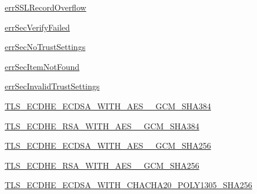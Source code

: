 \begin{DoxyCompactItemize}
\item 
\hyperlink{classpip_1_1__vendor_1_1urllib3_1_1contrib_1_1__securetransport_1_1bindings_1_1SecurityConst_a6361ab6de54d509899653e2301738fa6}{err\+S\+S\+L\+Record\+Overflow}
\item 
\hyperlink{classpip_1_1__vendor_1_1urllib3_1_1contrib_1_1__securetransport_1_1bindings_1_1SecurityConst_aa01c55eec87ae47c4c9557a581bef493}{err\+Sec\+Verify\+Failed}
\item 
\hyperlink{classpip_1_1__vendor_1_1urllib3_1_1contrib_1_1__securetransport_1_1bindings_1_1SecurityConst_aeabb8b2ed14e497e4c3575dc96698fb8}{err\+Sec\+No\+Trust\+Settings}
\item 
\hyperlink{classpip_1_1__vendor_1_1urllib3_1_1contrib_1_1__securetransport_1_1bindings_1_1SecurityConst_acc24ffa98895ba23120d1c7014f6dd15}{err\+Sec\+Item\+Not\+Found}
\item 
\hyperlink{classpip_1_1__vendor_1_1urllib3_1_1contrib_1_1__securetransport_1_1bindings_1_1SecurityConst_ab6516c07d300da7c704e2b7b22a98fb0}{err\+Sec\+Invalid\+Trust\+Settings}
\item 
\hyperlink{classpip_1_1__vendor_1_1urllib3_1_1contrib_1_1__securetransport_1_1bindings_1_1SecurityConst_ac43d314fcc301759995d34ff92bcbcaa}{T\+L\+S\+\_\+\+E\+C\+D\+H\+E\+\_\+\+E\+C\+D\+S\+A\+\_\+\+W\+I\+T\+H\+\_\+\+A\+E\+S\+\_\+\_\+\+G\+C\+M\+\_\+\+S\+H\+A384}
\item 
\hyperlink{classpip_1_1__vendor_1_1urllib3_1_1contrib_1_1__securetransport_1_1bindings_1_1SecurityConst_a7bf45af084c63e979b5e0a530e99d398}{T\+L\+S\+\_\+\+E\+C\+D\+H\+E\+\_\+\+R\+S\+A\+\_\+\+W\+I\+T\+H\+\_\+\+A\+E\+S\+\_\+\_\+\+G\+C\+M\+\_\+\+S\+H\+A384}
\item 
\hyperlink{classpip_1_1__vendor_1_1urllib3_1_1contrib_1_1__securetransport_1_1bindings_1_1SecurityConst_aa326743e754f5285fb4b9b489febb90f}{T\+L\+S\+\_\+\+E\+C\+D\+H\+E\+\_\+\+E\+C\+D\+S\+A\+\_\+\+W\+I\+T\+H\+\_\+\+A\+E\+S\+\_\+\_\+\+G\+C\+M\+\_\+\+S\+H\+A256}
\item 
\hyperlink{classpip_1_1__vendor_1_1urllib3_1_1contrib_1_1__securetransport_1_1bindings_1_1SecurityConst_a429b1ab9815b5936fc91e948043171d6}{T\+L\+S\+\_\+\+E\+C\+D\+H\+E\+\_\+\+R\+S\+A\+\_\+\+W\+I\+T\+H\+\_\+\+A\+E\+S\+\_\+\_\+\+G\+C\+M\+\_\+\+S\+H\+A256}
\item 
\hyperlink{classpip_1_1__vendor_1_1urllib3_1_1contrib_1_1__securetransport_1_1bindings_1_1SecurityConst_ae514583a08284860b00cd5a03055c069}{T\+L\+S\+\_\+\+E\+C\+D\+H\+E\+\_\+\+E\+C\+D\+S\+A\+\_\+\+W\+I\+T\+H\+\_\+\+C\+H\+A\+C\+H\+A20\+\_\+\+P\+O\+L\+Y1305\+\_\+\+S\+H\+A256}

\end{DoxyCompactItemize}
